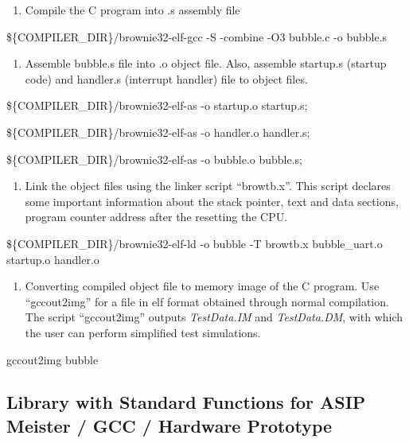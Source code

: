 \documentclass[
]{article}
\begin{document}
\begin{enumerate}
\def\labelenumi{\arabic{enumi}.}
\setcounter{enumi}{1}
\item
  Compile the C program into .s assembly file
\end{enumerate}

\$\{COMPILER\_DIR\}/brownie32-elf-gcc -S -combine -O3 bubble.c -o
bubble.s

\begin{enumerate}
\def\labelenumi{\arabic{enumi}.}
\setcounter{enumi}{2}
\item
  Assemble bubble.s file into .o object file. Also, assemble startup.s
  (startup code) and handler.s (interrupt handler) file to object files.
\end{enumerate}

\$\{COMPILER\_DIR\}/brownie32-elf-as -o startup.o startup.s;

\$\{COMPILER\_DIR\}/brownie32-elf-as -o handler.o handler.s;

\$\{COMPILER\_DIR\}/brownie32-elf-as -o bubble.o bubble.s;

\begin{enumerate}
\def\labelenumi{\arabic{enumi}.}
\setcounter{enumi}{3}
\item
  Link the object files using the linker script ``browtb.x''. This
  script declares some important information about the stack pointer,
  text and data sections, program counter address after the resetting
  the CPU.
\end{enumerate}

\$\{COMPILER\_DIR\}/brownie32-elf-ld -o bubble -T browtb.x
bubble\_uart.o startup.o handler.o

\begin{enumerate}
\def\labelenumi{\arabic{enumi}.}
\setcounter{enumi}{4}
\item
  Converting compiled object file to memory image of the C program. Use
  ``gccout2img'' for a file in elf format obtained through normal
  compilation. The script ``gccout2img'' outputs \emph{TestData.IM} and
  \emph{TestData.DM}, with which the user can perform simplified test
  simulations.
\end{enumerate}

gccout2img bubble

\hypertarget{library-with-standard-functions-for-asip-meister-gcc-hardware-prototype}{%
\subsection{Library with Standard Functions for ASIP Meister / GCC /
Hardware
Prototype}\label{library-with-standard-functions-for-asip-meister-gcc-hardware-prototype}}
\end{document}
